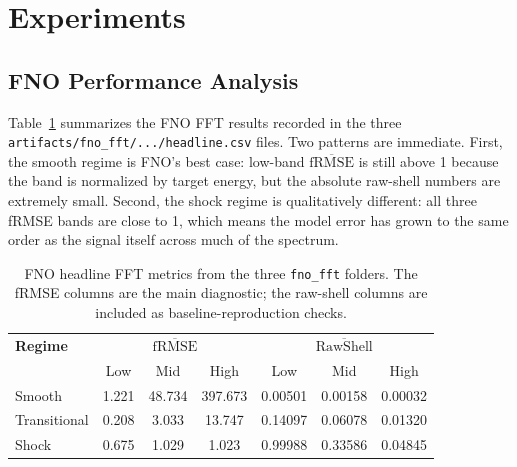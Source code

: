 \documentclass[11pt]{article}
\begin{document}
\section{Experiments}
\subsection{FNO Performance Analysis}
Table~\ref{tab:fno-metrics} summarizes the FNO FFT results recorded in the three \texttt{artifacts/fno\_fft/.../headline.csv} files. Two patterns are immediate. First, the smooth regime is FNO's best case: low-band $\overline{\mathrm{fRMSE}}$ is still above 1 because the band is normalized by target energy, but the absolute raw-shell numbers are extremely small. Second, the shock regime is qualitatively different: all three fRMSE bands are close to 1, which means the model error has grown to the same order as the signal itself across much of the spectrum.

\begin{table}[t]
\centering
\small
\begin{tabular}{@{}lccc|ccc@{}}
\toprule
\textbf{Regime} & \multicolumn{3}{c|}{\(\overline{\mathrm{fRMSE}}\)} & \multicolumn{3}{c}{\(\overline{\mathrm{RawShell}}\)} \\
 & Low & Mid & High & Low & Mid & High \\
\midrule
Smooth & 1.221 & 48.734 & 397.673 & 0.00501 & 0.00158 & 0.00032 \\
Transitional & 0.208 & 3.033 & 13.747 & 0.14097 & 0.06078 & 0.01320 \\
Shock & 0.675 & 1.029 & 1.023 & 0.99988 & 0.33586 & 0.04845 \\
\bottomrule
\end{tabular}
\caption{FNO headline FFT metrics from the three \texttt{fno\_fft} folders. The fRMSE columns are the main diagnostic; the raw-shell columns are included as baseline-reproduction checks.}
\label{tab:fno-metrics}
\end{table}
\end{document}

